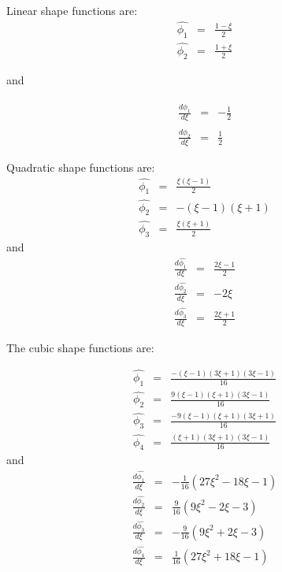 \documentclass[paper=a4, fontsize=11pt]{article} %
\begin{document}
Linear shape functions are:
\begin{eqnarray}
\hat{\phi_1} &=& \frac{1-\xi}{2}\nonumber\\
\hat{\phi_2} &=& \frac{1+\xi}{2}
\end{eqnarray}

and

\begin{eqnarray}
\frac{d\hat{\phi_1}}{d\xi} &=& -\frac{1}{2}\nonumber\\
\frac{d\hat{\phi_2}}{d\xi} &=& \frac{1}{2}
\end{eqnarray}

Quadratic shape functions are:
\begin{eqnarray}
\hat{\phi_1} &=& \frac{\xi(\xi-1)}{2} \nonumber\\
\hat{\phi_2} &=& -(\xi-1)(\xi+1)\nonumber\\
\hat{\phi_3} &=& \frac{\xi(\xi+1)} {2}
\end{eqnarray}
and 
\begin{eqnarray}
\frac{d\hat{\phi_1}}{d\xi} &=& \frac{2\xi-1}{2} \nonumber\\
\frac{d\hat{\phi_2}}{d\xi} &=& -2\xi \nonumber\\
\frac{d\hat{\phi_3}}{d\xi} &=& \frac{2\xi+1}{2}
\end{eqnarray}

The cubic shape functions are:

\begin{eqnarray}
\hat{\phi_1} &=& \frac{-(\xi-1)(3\xi+1)(3\xi-1)}{16} \nonumber\\
\hat{\phi_2} &=& \frac{9(\xi-1)(\xi+1)(3\xi-1)}{16} \nonumber\\
\hat{\phi_3} &=& \frac{-9(\xi-1)(\xi+1)(3\xi+1)}{16} \nonumber\\
\hat{\phi_4} &=& \frac{(\xi+1)(3\xi+1)(3\xi-1)}{16}
\end{eqnarray}
and
\begin{eqnarray}
\frac{d\hat{\phi_1}}{d\xi} &=& -\frac{1}{16} (27\xi^2 - 18\xi -1) \nonumber\\
\frac{d\hat{\phi_2}}{d\xi} &=& \frac{9}{16} (9\xi^2 -2\xi -3) \nonumber\\
\frac{d\hat{\phi_3}}{d\xi} &=& -\frac{9}{16} (9\xi^2 + 2\xi -3) \nonumber\\
\frac{d\hat{\phi_4}}{d\xi} &=& \frac{1}{16} (27\xi^2 + 18\xi-1)      
\end{eqnarray}
\end{document}
